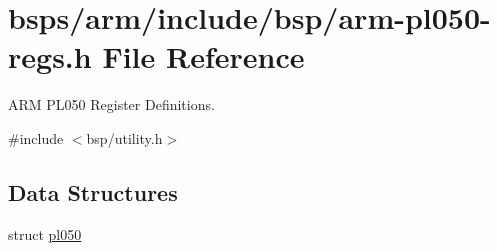 \hypertarget{arm-pl050-regs_8h}{}\section{bsps/arm/include/bsp/arm-\/pl050-\/regs.h File Reference}
\label{arm-pl050-regs_8h}


A\+RM P\+L050 Register Definitions.  


{\ttfamily \#include $<$bsp/utility.\+h$>$}\newline
\subsection*{Data Structures}
\begin{DoxyCompactItemize}
\item 
struct \mbox{\hyperlink{structpl050}{pl050}}
\end{DoxyCompactItemize}
